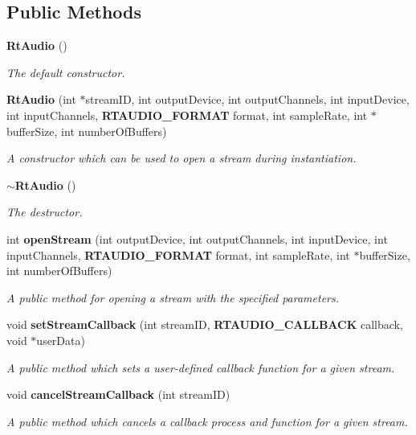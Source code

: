 \subsection*{Public Methods}
\begin{CompactItemize}
\item 
{\bf Rt\-Audio} ()
\begin{CompactList}\small\item\em The default constructor.\item\end{CompactList}\item 
{\bf Rt\-Audio} (int $\ast$stream\-ID, int output\-Device, int output\-Channels, int input\-Device, int input\-Channels, {\bf RTAUDIO\_\-FORMAT} format, int sample\-Rate, int $\ast$buffer\-Size, int number\-Of\-Buffers)
\begin{CompactList}\small\item\em A constructor which can be used to open a stream during instantiation.\item\end{CompactList}\item 
{\bf $\sim$Rt\-Audio} ()
\begin{CompactList}\small\item\em The destructor.\item\end{CompactList}\item 
int {\bf open\-Stream} (int output\-Device, int output\-Channels, int input\-Device, int input\-Channels, {\bf RTAUDIO\_\-FORMAT} format, int sample\-Rate, int $\ast$buffer\-Size, int number\-Of\-Buffers)
\begin{CompactList}\small\item\em A public method for opening a stream with the specified parameters.\item\end{CompactList}\item 
void {\bf set\-Stream\-Callback} (int stream\-ID, {\bf RTAUDIO\_\-CALLBACK} callback, void $\ast$user\-Data)
\begin{CompactList}\small\item\em A public method which sets a user-defined callback function for a given stream.\item\end{CompactList}\item 
void {\bf cancel\-Stream\-Callback} (int stream\-ID)
\begin{CompactList}\small\item\em A public method which cancels a callback process and function for a given stream.\item\end{CompactList}\item 

\end{CompactItemize}
